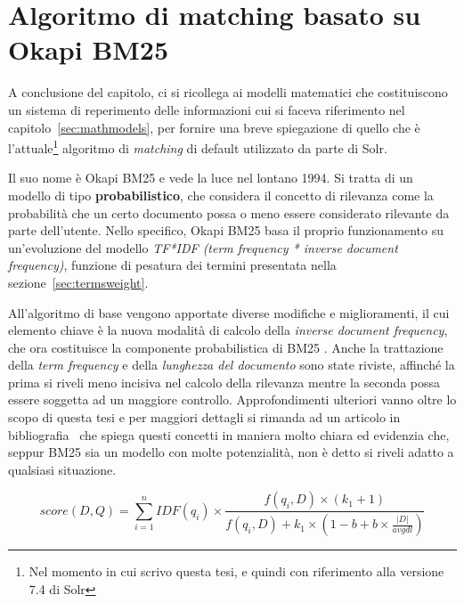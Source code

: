 \pagebreak
\section{Algoritmo di matching basato su Okapi BM25}

A conclusione del capitolo, ci si ricollega ai modelli matematici che costituiscono un sistema di reperimento delle informazioni cui si faceva riferimento nel capitolo~\ref{sec:mathmodels}, per fornire una breve spiegazione di quello che è l’attuale\footnote{Nel momento in cui scrivo questa tesi, e quindi con riferimento alla versione 7.4 di Solr} algoritmo di \textit{matching} di default utilizzato da parte di Solr.

\vspace{1em}
Il suo nome è Okapi BM25 e vede la luce nel lontano 1994. \newline
Si tratta di un modello di tipo \textbf{probabilistico}, che considera il concetto di rilevanza come la probabilità che un certo documento possa o meno essere considerato rilevante da parte dell’utente. Nello specifico, Okapi BM25 basa il proprio funzionamento su un’evoluzione del modello \textit{TF*IDF (term frequency * inverse document frequency)}, funzione di pesatura dei termini presentata nella sezione~\ref{sec:termsweight}. 

\vspace{1em}

All’algoritmo di base vengono apportate diverse modifiche e miglioramenti, il cui elemento chiave è la nuova modalità di calcolo della \textit{inverse document frequency}, che ora costituisce la componente probabilistica di BM25 . Anche la trattazione della \textit{term frequency} e della \textit{lunghezza del documento} sono state riviste, affinché la prima si riveli meno incisiva nel calcolo della rilevanza mentre la seconda possa essere soggetta ad un maggiore controllo. Approfondimenti ulteriori vanno oltre lo scopo di questa tesi e per maggiori dettagli si rimanda ad un articolo in bibliografia~\cite{bm25_osc} che spiega questi concetti in maniera molto chiara ed evidenzia che, seppur BM25 sia un modello con molte potenzialità, non è detto si riveli adatto a qualsiasi situazione.

\[score(D,Q) = \sum\limits_{i=1}^n IDF(q_{i}) \times \frac{f(q_{i}, D) \times (k_{1} + 1)}{f(q_{i}, D) + k_{1} \times (1 - b + b \times \frac{|D|}{avgdl})}\]

